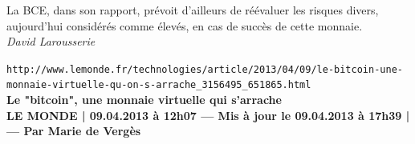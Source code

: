 \documentclass[11pt,twoside,a4paper]{article}
\begin{document}
La BCE, dans son rapport, pr{\'e}voit d'ailleurs de r{\'e}{\'e}valuer les risques divers, aujourd'hui consid{\'e}r{\'e}s comme {\'e}lev{\'e}s, en cas de succ{\`e}s de cette monnaie. ~\\

\emph{David Larousserie}~\\

\clearpage

\texttt{http://www.lemonde.fr/technologies/article/2013/04/09/le-bitcoin-une-monnaie-virtuelle-qu-on-s-arrache\_3156495\_651865.html}~\\

\textbf{Le "bitcoin", une monnaie virtuelle qui s'arrache}~\\

\textbf{\small LE MONDE | 09.04.2013 {\`a} 12h07 --- Mis {\`a} jour le 09.04.2013 {\`a} 17h39 | --- Par \textbf{Marie de Verg{\`e}s} }~\\
\end{document}
